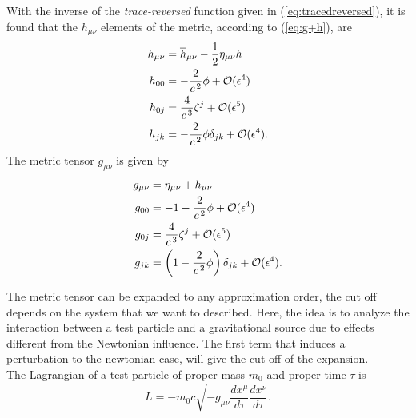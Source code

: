 With the inverse of the \textit{trace-reversed} function given in (\ref{eq:tracedreversed}), it is found that the $h_{\mu \nu}$ elements of the metric, according to (\ref{eq:g+h}), are
\begin{subequations}
\begin{align}
			h_{\mu \nu} &= \overline{h}_{\mu \nu} - \frac{1}{2}\eta_{\mu\nu}h\\
 			h_{00} &= -\frac{2}{c^{\hspace{0.05cm}2}}\phi + \mathcal{O}(\epsilon^4) \\
 			h_{0j} &= \frac{4}{c^{\hspace{0.05cm}3}}\zeta^j + \mathcal{O}(\epsilon^5) \\
  			h_{jk} &= -\frac{2}{c^{\hspace{0.05cm}2}}\phi \delta _{jk} + \mathcal{O}(\epsilon^4).
	\end{align}
\end{subequations}
The metric tensor $g_{\mu \nu}$ is given by
\begin{subequations}
	\begin{align} \label{eq:metrictensorsecondorder}
			g_{\mu\nu} &= \eta_{\mu\nu}+h_{\mu \nu}\\
 			g_{00} &= -1-\frac{2}{c^{\hspace{0.05cm}2}}\phi + \mathcal{O}(\epsilon^4) \\
 			g_{0j} &= \frac{4}{c^{\hspace{0.05cm}3}}\zeta^j + \mathcal{O}(\epsilon^5) \\
  			g_{jk} &= \left(1-\frac{2}{c^{\hspace{0.05cm}2}}\phi \right) \delta _{jk} + \mathcal{O}(\epsilon^4). 
	\end{align}
\end{subequations}

The metric tensor can be expanded to any approximation order, the cut off depends on the system that we want to described. Here, the idea is to analyze the interaction between a test particle and a gravitational source due to effects different from the Newtonian influence. The first term that induces a perturbation to the newtonian case, will give the cut off of the expansion.\\

The Lagrangian of a test particle of proper mass $m_0$ and proper time $\tau$ is
\begin{equation}
L = -m_0c\sqrt{-g_{\mu\nu}\frac{dx^{\mu}}{d\tau}\frac{dx^{\nu}}{d\tau}}.
\end{equation}

